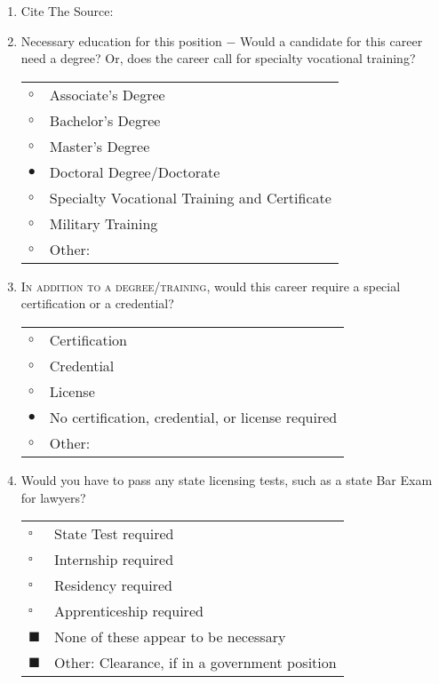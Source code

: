 \documentclass{article}
\begin{document}
\begin{enumerate}
\begin{tabular}{l l}
    \end{tabular}
    
    \item Cite The Source: \\
        \vspace{5pt}
        \cite{workNature:1}

   \item Necessary education for this position $-$ Would a candidate for this career need a degree? Or, does the career call for specialty vocational training?\\
     \vspace{5pt}
    \vspace{5pt}
    \begin{tabular}{l l}
    $\circ$ & Associate's Degree\\
    $\circ$ & Bachelor's Degree\\
    $\circ$ & Master's Degree\\
    $\bullet$ & Doctoral Degree/Doctorate\\
    $\circ$ & Specialty Vocational Training and Certificate\\
    $\circ$ & Military Training\\
    $\circ$ & Other:\\
    \end{tabular}
    
    \item \textsc{In addition to a degree/training}, would this career require a special certification or a credential?\\
    \vspace{5pt}
    \vspace{5pt}
    \begin{tabular}{l l}
    $\circ$ & Certification\\
    $\circ$ & Credential\\
    $\circ$ & License\\
    $\bullet$ & No certification, credential, or license required\\
    $\circ$ & Other:\\
    \end{tabular}
    
    \item Would you have to pass any state licensing tests, such as a state Bar Exam for lawyers?\\
    \vspace{5pt}
    \vspace{5pt}
    \begin{tabular}{l l}
    $\square$ & State Test required\\
    $\square$ & Internship required\\
    $\square$ & Residency required\\
    $\square$ & Apprenticeship required\\
    $\blacksquare$ & None of these appear to be necessary\\
    $\blacksquare$ & Other: Clearance, if in a government position\\
    \end{tabular}
    

\end{enumerate}
\end{document}

